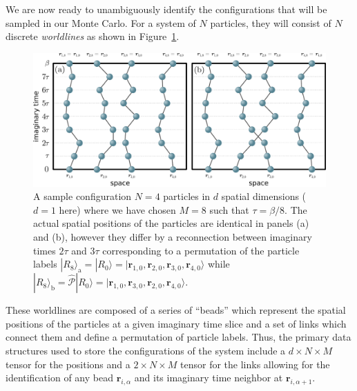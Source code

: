 \documentclass[prb,aps,amssym,nofootinbib,floatfix,notitlepage]{revtex4-1}
\renewcommand{\vec}[1]{\boldsymbol{#1}}
\begin{document}
We are now ready to unambiguously identify the configurations that will be
sampled in our Monte Carlo. For a system of $N$ particles, they will consist of
$N$ discrete \emph{worldlines} as shown in Figure~\ref{fig:config}. 
%
\begin{figure}
\begin{center}
\includegraphics[width=0.75\columnwidth]{Figures/worldlines.pdf}
\end{center}
\caption{A sample configuration $N=4$ particles in $d$ spatial dimensions ($d=1$
here) where we have chosen $M=8$ such that $\tau = \beta/8$. The actual
spatial positions of the particles are identical in panels (a) and (b),
however they differ by a reconnection between imaginary times $2\tau$ and $3\tau$
corresponding to a permutation of the particle labels $|R_8\rangle_\mathrm{a} =
|R_0\rangle = |\vec{r}_{1,0},\vec{r}_{2,0},\vec{r}_{3,0},\vec{r}_{4,0}\rangle$
while $|R_8\rangle_\mathrm{b} =
\hat{\mathcal{P}}|R_0\rangle =
|\vec{r}_{1,0},\vec{r}_{3,0},\vec{r}_{2,0},\vec{r}_{4,0}\rangle$.}
\label{fig:config}
 \end{figure}
%
These worldlines are composed of a series of ``beads'' which represent the
spatial positions of the particles at a given imaginary time slice and a set of
links which connect them and define a permutation of particle labels.  Thus,
the primary data structures used to store the configurations of the system
include a $d \times N \times M$ tensor for the positions and a $2 \times N
\times M$ tensor for the links allowing for the identification of any bead
$\vec{r}_{i,\alpha}$ and its imaginary time neighbor at $\vec{r}_{i,\alpha+1}$.
\end{document}
